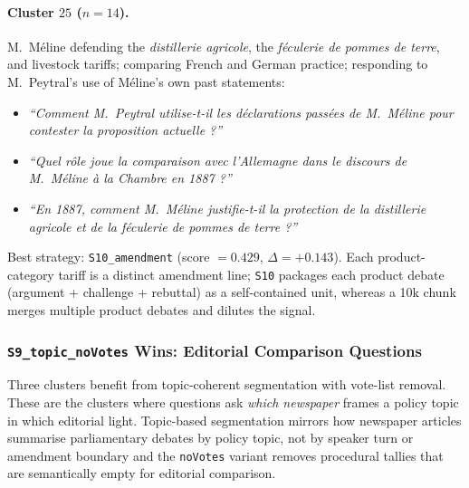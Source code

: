 \paragraph{Cluster $25$ ($n=14$).}
M.~M\'{e}line defending the \emph{distillerie agricole}, the \emph{f\'{e}culerie
de pommes de terre}, and livestock tariffs; comparing French and German practice;
responding to M.~Peytral's use of M\'{e}line's own past statements:
\begin{itemize}
  \item \textit{``Comment M.~Peytral utilise-t-il les d\'{e}clarations pass\'{e}es
    de M.~M\'{e}line pour contester la proposition actuelle ?''}
  \item \textit{``Quel r\^{o}le joue la comparaison avec l'Allemagne dans le
    discours de M.~M\'{e}line \`{a} la Chambre en 1887 ?''}
  \item \textit{``En 1887, comment M.~M\'{e}line justifie-t-il la protection de la
    distillerie agricole et de la f\'{e}culerie de pommes de terre ?''}
\end{itemize}
Best strategy: \texttt{S10\_amendment} (score $= 0.429$, $\Delta = +0.143$).
Each product-category tariff is a distinct amendment line; \texttt{S10} packages
each product debate (argument + challenge + rebuttal) as a self-contained unit,
whereas a 10k chunk merges multiple product debates and dilutes the signal.

\subsubsection{\texttt{S9\_topic\_noVotes} Wins: Editorial Comparison Questions}
\label{sec:s9-clusters}

Three clusters benefit from topic-coherent segmentation with vote-list removal.
These are the clusters where questions ask \emph{which newspaper} frames a policy
topic in which editorial light.
Topic-based segmentation mirrors how newspaper articles summarise parliamentary
debates by policy topic, not by speaker turn or amendment boundary and the
\texttt{noVotes} variant removes procedural tallies that are semantically empty
for editorial comparison.

